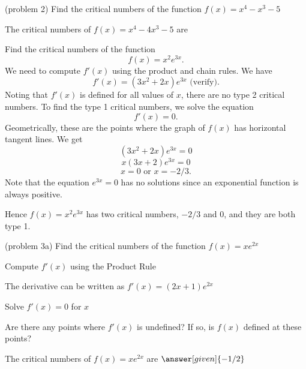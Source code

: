 \documentclass{ximera}
\begin{document}
\begin{problem}(problem 2)
  Find the critical numbers of the function $f(x) = x^4 - x^3 - 5$
    
		The critical numbers of $f(x) = x^4 - 4x^3 - 5$ are
		\begin{multipleChoice}
		\end{multipleChoice} 
		
\end{problem}




\begin{example}[example 3] Find the critical numbers of the function 
\[f(x) = x^2e^{3x}.\]
We need to compute $f'(x)$ using the product and chain rules.  We have
\[f'(x) = (3x^2 +2x)e^{3x} \mbox{   (verify)}.\]
Noting that $f'(x)$ is defined for all values of $x$, there are no type 2 critical numbers.
To find the type 1 critical numbers, we solve the equation
\[f'(x) = 0.\]
Geometrically, these are the points where the graph of $f(x)$ has horizontal tangent lines.
We get
\[ (3x^2 +2x)e^{3x} =0\]
\[ x(3x+2)e^{3x} =0\]
\[x = 0 \mbox{   or   }  x = -2/3.\]
Note that the equation $e^{3x} = 0$ has no solutions since an exponential function is always positive.

Hence $f(x) = x^2e^{3x}$ has two critical numbers, $-2/3$ and $0$, and they are both type 1. 

\begin{image}
\end{image}

\end{example}

\begin{problem}(problem 3a)
  Find the critical numbers of the function $f(x) = xe^{2x}$
  
  
    \begin{hint}
      Compute $f'(x)$ using the Product Rule
    \end{hint}
    \begin{hint}
      The derivative can be written as $f'(x) = (2x + 1)e^{2x}$
    \end{hint}
		\begin{hint}
      Solve $f'(x) = 0$ for $x$
    \end{hint}
    \begin{hint}
      Are there any points where $f'(x)$ is undefined?
      If so, is $f(x)$ defined at these points?  
		\end{hint}
    
    
		The critical numbers of $f(x) = xe^{2x}$ are
		 $\answer[given]{-1/2}$
		
\end{problem}
\end{document}
